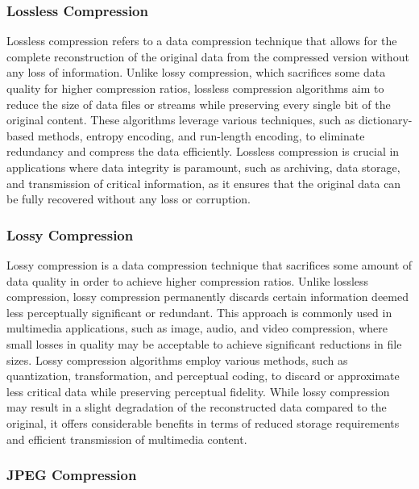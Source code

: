 \subsubsection{Lossless Compression}

Lossless compression refers to a data compression technique that allows for the complete reconstruction of the original data from the compressed version without any loss of information. Unlike lossy 
compression, which sacrifices some data quality for higher compression ratios, lossless compression algorithms aim to reduce the size of data files or streams while preserving every single bit of the 
original content. These algorithms leverage various techniques, such as dictionary-based methods, entropy encoding, and run-length encoding, to eliminate redundancy and compress the data efficiently. 
Lossless compression is crucial in applications where data integrity is paramount, such as archiving, data storage, and transmission of critical information, as it ensures that the original data can 
be fully recovered without any loss or corruption.

\subsubsection{Lossy Compression}

Lossy compression is a data compression technique that sacrifices some amount of data quality in order to achieve higher compression ratios. Unlike lossless compression, lossy compression permanently 
discards certain information deemed less perceptually significant or redundant. This approach is commonly used in multimedia applications, such as image, audio, and video compression, where small 
losses in quality may be acceptable to achieve significant reductions in file sizes. Lossy compression algorithms employ various methods, such as quantization, transformation, and perceptual coding, 
to discard or approximate less critical data while preserving perceptual fidelity. While lossy compression may result in a slight degradation of the reconstructed data compared to the original, it 
offers considerable benefits in terms of reduced storage requirements and efficient transmission of multimedia content.

\subsubsection{JPEG Compression}

